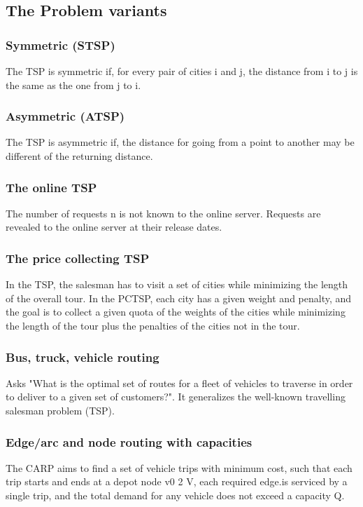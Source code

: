 \documentclass[12pt]{article}
\begin{document}
\subsection{ The Problem variants }

\subsubsection{ Symmetric (STSP) }
The TSP is symmetric if, for every pair of cities i and j, the distance from i to j is the same as the one from j to i.

\subsubsection{ Asymmetric (ATSP) }
The TSP is asymmetric if, the distance for going from a point to another may be different of the returning distance.

\subsubsection{ The online TSP }
The number of requests n is not known to the online server. Requests are revealed to the online server at their release dates.

\subsubsection{ The price collecting TSP }
In the TSP, the salesman has to visit a set of cities while minimizing the length of the overall tour. In the PCTSP, each city has a given weight and penalty, and the goal is to collect a given quota of the weights of the cities while minimizing the length of the tour plus the penalties of the cities not in the tour.

\subsubsection{ Bus, truck, vehicle routing }
Asks "What is the optimal set of routes for a fleet of vehicles to traverse in order to deliver to a given set of customers?". It generalizes the well-known travelling salesman problem (TSP).

\subsubsection{ Edge/arc and node routing with capacities }
The CARP aims to find a set of vehicle trips with minimum cost, such that each trip starts and ends at a depot node v0 2 V, each required edge.is serviced by a single trip, and the total demand for any vehicle does not exceed a capacity Q.
\end{document}
